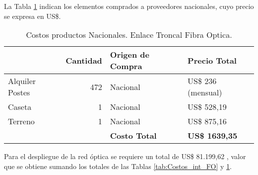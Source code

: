 La Tabla \ref{tab:Costos_nac_FO} indican los elementos comprados a proveedores nacionales, cuyo precio se expresa en US\$. 



\begin{table}[htbp]
  \centering
    \begin{tabular}{|r|r|l|l|}
    \hline
    \rowcolor[HTML]{C5D9F1} \multicolumn{1}{|l|}{\textbf{Descripción}} & \multicolumn{1}{l|}{\textbf{Cantidad}} & \textbf{Origen de Compra} & \textbf{Precio Total} \bigstrut\\
    \hline
    \multicolumn{1}{|l|}{Alquiler Postes} & 472   & Nacional & US\$ 236 (mensual) \bigstrut\\
    \hline
    \multicolumn{1}{|l|}{Caseta} & 1     & Nacional & US\$ 528,19 \bigstrut\\
    \hline
    \multicolumn{1}{|l|}{Terreno} & 1     & Nacional & US\$ 875,16 \bigstrut\\
    \hline
    \rowcolor[HTML]{C5D9F1}       &       & \textbf{Costo Total} & \textbf{US\$ 1639,35} \bigstrut\\
    \hline
    \end{tabular}%
\caption{Costos productos Nacionales. Enlace Troncal Fibra Optica.}
  \label{tab:Costos_nac_FO}%
\end{table}%



Para el despliegue de la red óptica se requiere un total de  US\$ 81.199,62 , valor que se obtiene sumando los totales de las Tablas \ref{tab:Costos_int_FO} y \ref{tab:Costos_nac_FO}.


\newpage
